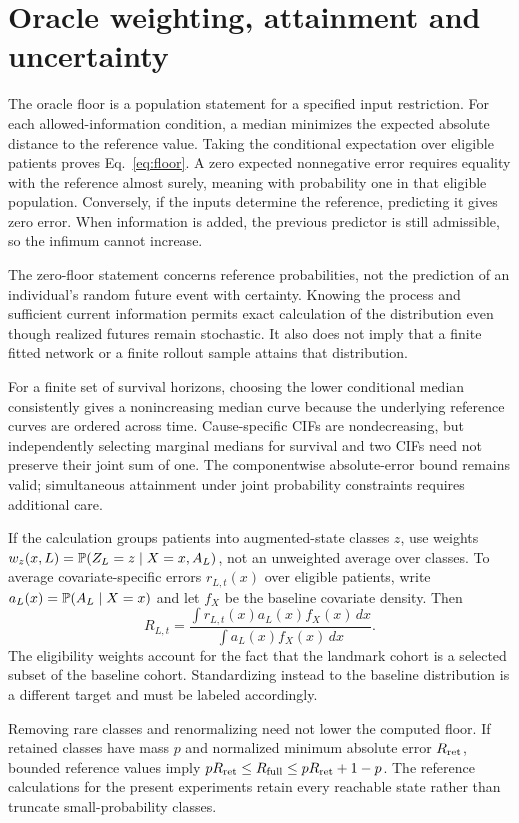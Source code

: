 \section{Oracle weighting, attainment and uncertainty}\label{app:oracle}
The oracle floor is a population statement for a specified input restriction. For each allowed-information condition, a median minimizes the expected absolute distance to the reference value. Taking the conditional expectation over eligible patients proves Eq.~\eqref{eq:floor}. A zero expected nonnegative error requires equality with the reference almost surely, meaning with probability one in that eligible population. Conversely, if the inputs determine the reference, predicting it gives zero error. When information is added, the previous predictor is still admissible, so the infimum cannot increase.

The zero-floor statement concerns reference probabilities, not the prediction of an individual's random future event with certainty. Knowing the process and sufficient current information permits exact calculation of the distribution even though realized futures remain stochastic. It also does not imply that a finite fitted network or a finite rollout sample attains that distribution.

For a finite set of survival horizons, choosing the lower conditional median consistently gives a nonincreasing median curve because the underlying reference curves are ordered across time. Cause-specific CIFs are nondecreasing, but independently selecting marginal medians for survival and two CIFs need not preserve their joint sum of one. The componentwise absolute-error bound remains valid; simultaneous attainment under joint probability constraints requires additional care.

If the calculation groups patients into augmented-state classes $z$, use weights $w_z(x,L)=\mathbb P(Z_L=z\mid X=x,A_L)$, not an unweighted average over classes. To average covariate-specific errors $r_{L,t}(x)$ over eligible patients, write $a_L(x)=\mathbb P(A_L\mid X=x)$ and let $f_X$ be the baseline covariate density. Then
\begin{equation}\label{eq:weight}
R_{L,t}=\frac{\int r_{L,t}(x)a_L(x)f_X(x)\,dx}{\int a_L(x)f_X(x)\,dx}.
\end{equation}
The eligibility weights account for the fact that the landmark cohort is a selected subset of the baseline cohort. Standardizing instead to the baseline distribution is a different target and must be labeled accordingly.

Removing rare classes and renormalizing need not lower the computed floor. If retained classes have mass $p$ and normalized minimum absolute error $R_{\rm ret}$, bounded reference values imply $pR_{\rm ret}\le R_{\rm full}\le pR_{\rm ret}+1-p$. The reference calculations for the present experiments retain every reachable state rather than truncate small-probability classes.

